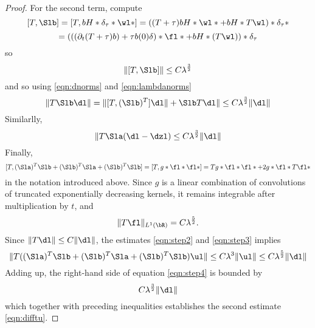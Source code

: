 \begin{proof}
For the second term, compute
\[
  [T, \Slb] = [T,bH*\delta_{\tau}*\wl*] = ((T+\tau)bH*\wl*
  + bH*T\wl)*\delta_{\tau}*
\]
\[
  = (((\partial_t (T+\tau)b) + \tau
  b(0)\delta)* \fl * + bH*(T\wl))*\delta_{\tau}
\]
so
\[
  \|[T,\Slb]\| \le C\lambda^{\frac{3}{2}}
\]
and so using \ref{eqn:dnorms} and \ref{eqn:lambdanorms}
\[
\|T\Slb \dl \|=  \|[T,(\Slb)^T]\dl \|+ \Slb T\dl\| \le C\lambda^{\frac{3}{2}}\|\dl\|
\]
Similarlly,
\[
\|T\Sla (\dl-\dzl) \le C \lambda^{\frac{3}{2}}\|\dl\|
\]
Finally,
\[
  [T, (\Sla)^T\Slb + (\Slb)^T\Sla + (\Slb)^T\Slb] = [T,g*\fl*\fl*] =
  Tg*\fl*\fl* + 2 g*\fl*T\fl*
\]
in the notation introduced above. Since $g$ is a linear combination of
convolutions of truncated exponentially decreasing kernels, it remains
integrable after multiplication by $t$, and
\[
\|T\fl\|_{L^1(\bR)} = C\lambda^{\frac{5}{2}}. 
\]
Since $\|T\dl\| \le C\|\dl\|$, the estimates \ref{eqn:step2} and \ref{eqn:step3} implies
\[
  \|T ((\Sla)^T\Slb + (\Slb)^T\Sla + (\Slb)^T\Slb)\ul\| \le
  C\lambda^{3}\|\ul\| \le C\lambda^{\frac{5}{2}} \|\dl\|
\]
Adding up, the right-hand side of equation \ref{eqn:step4} is bounded
by
\[
  C \lambda^{\frac{3}{2}}\|\dl\|
\]
which together with preceding inequalities establishes the second estimate \ref{eqn:difftu}.

\end{proof}

